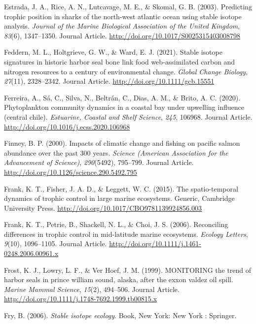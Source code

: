 \documentclass [11pt, proquest] {uwthesis}[2015/03/03]
\begin{document}
\hypertarget{ref-Estrada2003}{}
Estrada, J. A., Rice, A. N., Lutcavage, M. E., \& Skomal, G. B. (2003).
Predicting trophic position in sharks of the north-west atlantic ocean
using stable isotope analysis. \emph{Journal of the Marine Biological
Association of the United Kingdom}, \emph{83}(6), 1347--1350. Journal
Article. \url{http://doi.org/10.1017/S0025315403008798}

\hypertarget{ref-Feddern2021}{}
Feddern, M. L., Holtgrieve, G. W., \& Ward, E. J. (2021). Stable isotope
signatures in historic harbor seal bone link food web‐assimilated carbon
and nitrogen resources to a century of environmental change.
\emph{Global Change Biology}, \emph{27}(11), 2328--2342. Journal
Article. \url{http://doi.org/10.1111/gcb.15551}

\hypertarget{ref-Ferreira2020}{}
Ferreira, A., Sá, C., Silva, N., Beltrán, C., Dias, A. M., \& Brito, A.
C. (2020). Phytoplankton community dynamics in a coastal bay under
upwelling influence (central chile). \emph{Estuarine, Coastal and Shelf
Science}, \emph{245}, 106968. Journal Article.
\url{http://doi.org/10.1016/j.ecss.2020.106968}

\hypertarget{ref-Finney2000}{}
Finney, B. P. (2000). Impacts of climatic change and fishing on pacific
salmon abundance over the past 300 years. \emph{Science (American
Association for the Advancement of Science)}, \emph{290}(5492),
795--799. Journal Article.
\url{http://doi.org/10.1126/science.290.5492.795}

\hypertarget{ref-Frank2015}{}
Frank, K. T., Fisher, J. A. D., \& Leggett, W. C. (2015). The
spatio-temporal dynamics of trophic control in large marine ecosystems.
Generic, Cambridge University Press.
\url{http://doi.org/10.1017/CBO9781139924856.003}

\hypertarget{ref-Frank2006}{}
Frank, K. T., Petrie, B., Shackell, N. L., \& Choi, J. S. (2006).
Reconciling differences in trophic control in mid-latitude marine
ecosystems. \emph{Ecology Letters}, \emph{9}(10), 1096--1105. Journal
Article. \url{http://doi.org/10.1111/j.1461-0248.2006.00961.x}

\hypertarget{ref-Frost1999}{}
Frost, K. J., Lowry, L. F., \& Ver Hoef, J. M. (1999). MONITORING the
trend of harbor seals in prince william sound, alaska, after the exxon
valdez oil spill. \emph{Marine Mammal Science}, \emph{15}(2), 494--506.
Journal Article. \url{http://doi.org/10.1111/j.1748-7692.1999.tb00815.x}

\hypertarget{ref-Fry2006}{}
Fry, B. (2006). \emph{Stable isotope ecology}. Book, New York: New York
: Springer.
\end{document}
